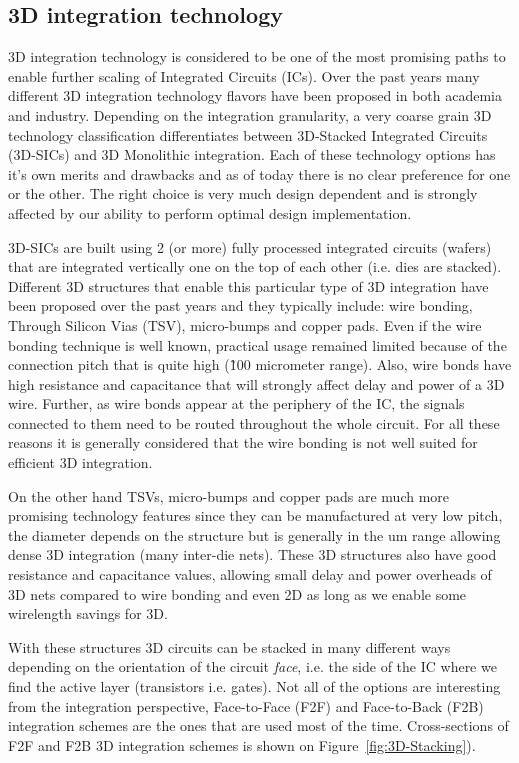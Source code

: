 \subsection{3D integration technology}
3D integration technology is considered to be one of the most promising paths to enable further scaling of Integrated Circuits (ICs). Over the past years many different 3D integration technology flavors have been proposed in both academia and industry. Depending on the integration granularity, a very coarse grain 3D technology classification differentiates between 3D-Stacked Integrated Circuits (3D-SICs) and 3D Monolithic integration. Each of these technology options has it's own merits and drawbacks and as of today there is no clear preference for one or the other. The right choice is very much design dependent and is strongly affected by our ability to perform optimal design implementation.

3D-SICs are built using 2 (or more) fully processed integrated circuits (wafers) that are integrated vertically one on the top of each other (i.e. dies are stacked). Different 3D structures that enable this particular type of 3D integration have been proposed over the past years and they typically include: wire bonding, Through Silicon Vias (TSV), micro-bumps and copper pads. Even if the wire bonding technique is well known, practical usage remained limited because of the connection pitch that is quite high (\~100 micrometer range). Also, wire bonds have high resistance and capacitance that will strongly affect delay and power of a 3D wire. Further, as wire bonds appear at the periphery of the IC, the signals connected to them need to be routed throughout the whole circuit. For all these reasons it is generally considered that the wire bonding is not well suited for efficient 3D integration.

On the other hand TSVs, micro-bumps and copper pads are much more promising technology features since they can be manufactured at very low pitch, the diameter depends on the structure but is generally in the um range allowing dense 3D integration (many inter-die nets). These 3D structures also have good resistance and capacitance values, allowing small delay and power overheads of 3D nets compared to wire bonding and even 2D as long as we enable some wirelength savings for 3D.

With these structures 3D circuits can be stacked in many different ways depending on the orientation of the circuit \emph{face}, i.e. the side of the IC where we find the active layer (transistors i.e. gates). Not all of the options are interesting from the integration perspective, Face-to-Face (F2F) and Face-to-Back (F2B) integration schemes are the ones that are used most of the time. Cross-sections of F2F and F2B 3D integration schemes is shown on Figure~\ref{fig:3D-Stacking}).

